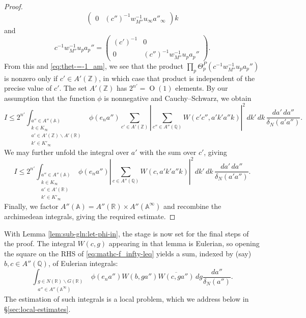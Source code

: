 \documentclass[reqno]{amsart}
\def\O{\operatorname{O}}
\theoremstyle{plain} \newtheorem{theorem} {Theorem}
\theoremstyle{definition} \newtheorem{definition} [theorem] {Definition}
\theoremstyle{itplain} %
\numberwithin{equation}{section}
\numberwithin{theorem}{section}
\renewcommand{\leq}{\leqslant}
\begin{document}
\begin{proof}
\begin{equation*}
\begin{pmatrix}
    0 & (c'')^{-1} w_{M''}^{-1} u_\infty a''_\infty 
  \end{pmatrix} k
\end{equation*}
and
\begin{equation*}
  c^{-1} w_{M''}^{-1} u_p a_p''
  =
  \begin{pmatrix}
    (c')^{-1} & 0 \\
    0 & (c'')^{-1} w_{M''}^{-1} u_p a_p''
  \end{pmatrix}.
\end{equation*}
From this and \eqref{eq:thet-=-1_am}, we see that the product $\prod_p \Theta_p^P(c^{-1} w_{M''}^{-1} u_p a_p'')$ is nonzero only if $c' \in A'(\mathbb{Z})$, in which case that product is independent of the precise value of $c'$.  The set $A'(\mathbb{Z})$ has $2^{n'} = \O(1)$ elements.  By our assumption that the function $\phi$ is nonnegative and Cauchy--Schwarz, we obtain
\begin{equation*}
  I \leq
  2^{n'}
  \int _{
    \substack{
      a'' \in A''(\mathbb{A})  \\
      k \in K_\infty  \\
      a' \in A'(\mathbb{Z}) \backslash A'(\mathbb{R}) \\
      k' \in K'_\infty 
    }
  } 
  \phi(e_n a'')
  \sum _{c' \in A'(\mathbb{Z})}
  \left\lvert
    \sum _{c'' \in A''(\mathbb{Q})}
    W(c' c'', a' k' a'' k)
  \right\rvert^2
  \, d k' \, d k \, \frac{d a' \, d a''}{\delta_N(a' a'')}.
\end{equation*}
We may further unfold the integral over $a'$ with the sum over $c'$, giving
\begin{equation*}
  I
  \leq
    2^{n'}
  \int _{
    \substack{
    a'' \in A''(\mathbb{A})  \\
      k \in K_\infty  \\
      a' \in A'(\mathbb{R}) \\
      k' \in K'_\infty 
    }
  } 
  \phi(e_n a'')
  \left\lvert
  \sum _{c \in A''(\mathbb{Q})}
  W(c,a' k' a'' k)
  \right\rvert^2
  \, d k' \, d k \, \frac{d a' \, d a''}{\delta_N(a' a'')}.
\end{equation*}
Finally, we factor $A''(\mathbb{A}) = A''(\mathbb{R}) \times A''(\mathbb{A}^\infty)$ and recombine the archimedean integrals, giving the required estimate.
\end{proof}

With Lemma \ref{lem:sub-gln:let-phi-in}, the stage is now set for the final steps of the proof.  The integral $W(c,g)$ appearing in that lemma is Eulerian, so opening the square on the RHS of \eqref{eq:mathc-f_infty-leq} yields a sum, indexed by (say) $b,c \in A''(\mathbb{Q})$, of Eulerian integrals:
\begin{equation*}
    \int _{
    \substack{
      g \in N(\mathbb{R}) \backslash G(\mathbb{R}) \\
      a'' \in A''(\mathbb{A}^\infty)
    }
  } 
  \phi(e_n a'')
  W(b, g a'')
  \overline{W(c, g a'')}
  \, d g \frac{d a''}{\delta_N(a'')}.
\end{equation*}
The estimation of such integrals is a local problem, which we address below in \S\ref{sec:local-estimates}.
\end{document}
